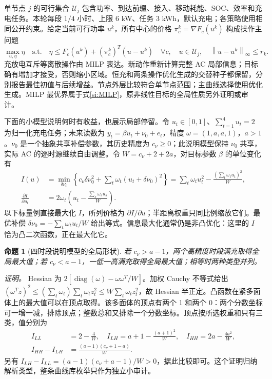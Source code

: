 \documentclass[UTF8,fontset=fandol,11pt,a4paper]{ctexart}
\newtheorem{proposition}{命题}
\newcommand{\norm}[1]{\left\lVert#1\right\rVert}
\begin{document}
单节点 $j$ 的可行集合 $\mathcal U_j$ 包含功率、到达前缀、接入、移动耗能、SOC、效率和充电任务。本轮每段 $1/4$ 小时、上限 6 kW、任务 3 kWh，默认充电；各策略使用相同公开约束。给定当前可行功率 $u^k$，所有中心的价格 $\pi_c^k=\nabla F_c(u^k)$ 构成操作主问题
\begin{equation}
 \max_{u,\eta}\eta\quad\text{s.t.}\quad
 \eta\le F_c(u^k)+(\pi_c^k)^T(u-u^k)\quad\forall c,
 \quad u\in\mathcal U_j,\quad\norm{u-u^k}_\infty\le r_k.
 \label{si:MILP}
\end{equation}
充放电互斥等离散操作由 MILP 表达。新动作重新计算完整 AC 局部信息；目标确有增加才接受，否则缩小区域。恒充和两条操作优化生成的交替种子都保留，分别报告最佳初值与后续增益。节点外层比较符合单节点范围；主曲线选择使用优化生成。MILP 最优界属于式\eqref{si:MILP}，原非线性目标的全局性质另外证明或审计。

下面的小模型说明何时有收益，也展示局部停留。令 $u_t\in[0,1]$、$\sum_{t=1}^4u_t=2$ 为归一化充电任务；未来读数为 $y_t=\beta u_t+\nu_0+e_t$，精度 $\omega=(1,a,a,1)$，$a>1$。$\nu_0$ 是一个抽象共享补偿参数，其历史精度为 $c_\nu\ge0$；此说明模型保持 $\nu_0$ 共享，实际 AC 的逐时源继续自由调整。令 $W=c_\nu+2+2a$，对目标参数 $\beta$ 的单位变化有
\begin{align}
 I(u)&=\min_{\delta\nu_0}\left\{c_\nu\delta\nu_0^2+\sum_t\omega_t(u_t+\delta\nu_0)^2\right\}
 =\sum_t\omega_tu_t^2-\frac{(\sum_t\omega_tu_t)^2}{W},\nonumber\\
 \frac{\partial I}{\partial u_t}&=2\omega_t\left(u_t-\frac{\sum_s\omega_su_s}{W}\right).
 \label{si:scalar}
\end{align}
以下标量例直接最大化 $I$，所列价格为 $\partial I/\partial u$；半距离权重只同比例缩放它们。最优补偿 $\delta\nu_0=-\sum_t\omega_tu_t/W$ 给出等式。信息最大化通常仍是非凸优化：这里的 $I$ 恰为凸二次函数，正在最大化它。

\begin{proposition}[四时段说明模型的全局形状]
若 $c_\nu>a-1$，两个高精度时段满充取得全局最大值；若 $c_\nu<a-1$，一低一高满充取得全局最大值；相等时两种类型并列。
\end{proposition}
\noindent\emph{证明。} Hessian 为 $2[\operatorname{diag}(\omega)-\omega\omega^T/W]$。加权 Cauchy 不等式给出
$(\omega^Tz)^2\le(\sum_t\omega_t)\sum_t\omega_tz_t^2\le W\sum_t\omega_tz_t^2$，故 Hessian 半正定。凸函数在紧多面体上的最大值可以在顶点取得。该多面体的顶点有两个 1 和两个 0：两个分数坐标可一增一减，排除顶点；整数总和又排除一个分数坐标。顶点按所选权重和只有三类，值分别为
\begin{align}
 I_{LL}&=2-\frac4W,\quad I_{LH}=a+1-\frac{(a+1)^2}{W},\quad
 I_{HH}=2a-\frac{4a^2}{W},\nonumber\\
 I_{HH}-I_{LH}&=\frac{(a-1)(c_\nu+1-a)}W.
 \label{si:three-types}
\end{align}
另有 $I_{LH}-I_{LL}=(a-1)(c_\nu+a-1)/W>0$，据此比较即可。这个证明归纳解析类型，整条曲线库枚举只作为独立小审计。
\end{document}
